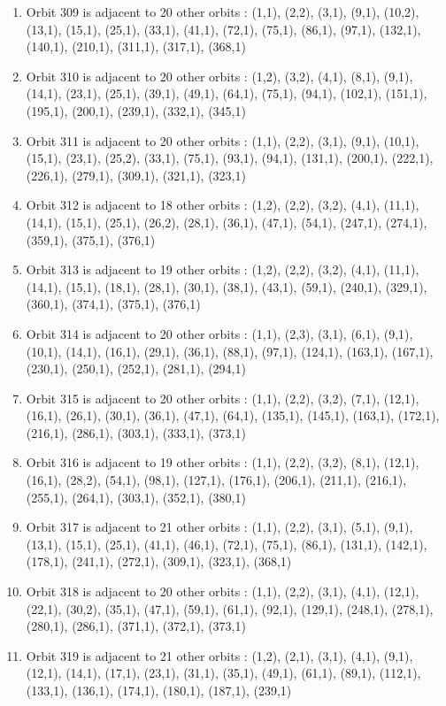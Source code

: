 \documentclass[12pt]{article}
\begin{document}
\begin{enumerate}
\item Orbit 309 is adjacent to 20 other orbits : (1,1), (2,2), (3,1), (9,1), (10,2), (13,1), (15,1), (25,1), (33,1), (41,1), (72,1), (75,1), (86,1), (97,1), (132,1), (140,1), (210,1), (311,1), (317,1), (368,1)
\item Orbit 310 is adjacent to 20 other orbits : (1,2), (3,2), (4,1), (8,1), (9,1), (14,1), (23,1), (25,1), (39,1), (49,1), (64,1), (75,1), (94,1), (102,1), (151,1), (195,1), (200,1), (239,1), (332,1), (345,1)
\item Orbit 311 is adjacent to 20 other orbits : (1,1), (2,2), (3,1), (9,1), (10,1), (15,1), (23,1), (25,2), (33,1), (75,1), (93,1), (94,1), (131,1), (200,1), (222,1), (226,1), (279,1), (309,1), (321,1), (323,1)
\item Orbit 312 is adjacent to 18 other orbits : (1,2), (2,2), (3,2), (4,1), (11,1), (14,1), (15,1), (25,1), (26,2), (28,1), (36,1), (47,1), (54,1), (247,1), (274,1), (359,1), (375,1), (376,1)
\item Orbit 313 is adjacent to 19 other orbits : (1,2), (2,2), (3,2), (4,1), (11,1), (14,1), (15,1), (18,1), (28,1), (30,1), (38,1), (43,1), (59,1), (240,1), (329,1), (360,1), (374,1), (375,1), (376,1)
\item Orbit 314 is adjacent to 20 other orbits : (1,1), (2,3), (3,1), (6,1), (9,1), (10,1), (14,1), (16,1), (29,1), (36,1), (88,1), (97,1), (124,1), (163,1), (167,1), (230,1), (250,1), (252,1), (281,1), (294,1)
\item Orbit 315 is adjacent to 20 other orbits : (1,1), (2,2), (3,2), (7,1), (12,1), (16,1), (26,1), (30,1), (36,1), (47,1), (64,1), (135,1), (145,1), (163,1), (172,1), (216,1), (286,1), (303,1), (333,1), (373,1)
\item Orbit 316 is adjacent to 19 other orbits : (1,1), (2,2), (3,2), (8,1), (12,1), (16,1), (28,2), (54,1), (98,1), (127,1), (176,1), (206,1), (211,1), (216,1), (255,1), (264,1), (303,1), (352,1), (380,1)
\item Orbit 317 is adjacent to 21 other orbits : (1,1), (2,2), (3,1), (5,1), (9,1), (13,1), (15,1), (25,1), (41,1), (46,1), (72,1), (75,1), (86,1), (131,1), (142,1), (178,1), (241,1), (272,1), (309,1), (323,1), (368,1)
\item Orbit 318 is adjacent to 20 other orbits : (1,1), (2,2), (3,1), (4,1), (12,1), (22,1), (30,2), (35,1), (47,1), (59,1), (61,1), (92,1), (129,1), (248,1), (278,1), (280,1), (286,1), (371,1), (372,1), (373,1)
\item Orbit 319 is adjacent to 21 other orbits : (1,2), (2,1), (3,1), (4,1), (9,1), (12,1), (14,1), (17,1), (23,1), (31,1), (35,1), (49,1), (61,1), (89,1), (112,1), (133,1), (136,1), (174,1), (180,1), (187,1), (239,1)

\end{enumerate}
\end{document}
